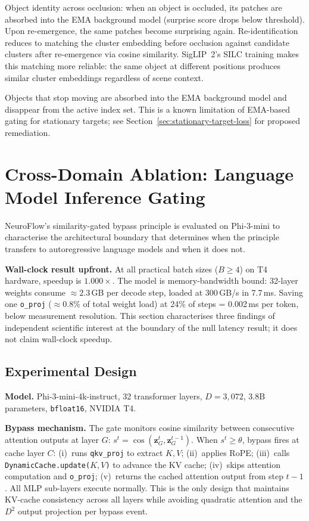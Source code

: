 \documentclass{article}
\begin{document}
Object identity across occlusion: when an object is occluded, its patches
are absorbed into the EMA background model (surprise score drops below
threshold). Upon re-emergence, the same patches become surprising again.
Re-identification reduces to matching the cluster embedding before
occlusion against candidate clusters after re-emergence via cosine
similarity. SigLIP~2's SILC training makes this matching more reliable:
the same object at different positions produces similar cluster embeddings
regardless of scene context.

Objects that stop moving are absorbed into the EMA background model and
disappear from the active index set. This is a known limitation of
EMA-based gating for stationary targets; see
Section~\ref{sec:stationary-target-loss} for proposed remediation.


\section{Cross-Domain Ablation: Language Model Inference Gating}
\label{sec:llm-ablation}

NeuroFlow's similarity-gated bypass principle is evaluated on Phi-3-mini
to characterise the architectural boundary that determines when the
principle transfers to autoregressive language models and when it does not.

\textbf{Wall-clock result upfront.} At all practical batch sizes
($B \geq 4$) on T4 hardware, speedup is $\mathbf{1.000\times}$. The model
is memory-bandwidth bound: 32-layer weights consume $\approx$2.3\,GB per
decode step, loaded at 300\,GB/s in 7.7\,ms. Saving one \texttt{o\_proj}
($\approx$0.8\% of total weight load) at 24\% of steps = 0.002\,ms per
token, below measurement resolution. This section characterises three
findings of independent scientific interest at the boundary of the null
latency result; it does not claim wall-clock speedup.

\subsection{Experimental Design}
\label{sec:llm-design}

\textbf{Model.} Phi-3-mini-4k-instruct, 32 transformer layers,
$D = 3{,}072$, 3.8B parameters, \texttt{bfloat16}, NVIDIA T4.

\textbf{Bypass mechanism.} The gate monitors cosine similarity between
consecutive attention outputs at layer $G$: $s^t = \cos(\mathbf{z}_G^t,
\mathbf{z}_G^{t-1})$. When $s^t \geq \theta$, bypass fires at cache layer
$C$: (i)~runs \texttt{qkv\_proj} to extract $K, V$; (ii)~applies RoPE;
(iii)~calls \texttt{DynamicCache.update($K, V$)} to advance the KV cache;
(iv)~skips attention computation and \texttt{o\_proj}; (v)~returns the
cached attention output from step $t-1$. All MLP sub-layers execute
normally. This is the only design that maintains KV-cache consistency
across all layers while avoiding quadratic attention and the $D^2$ output
projection per bypass event.
\end{document}
